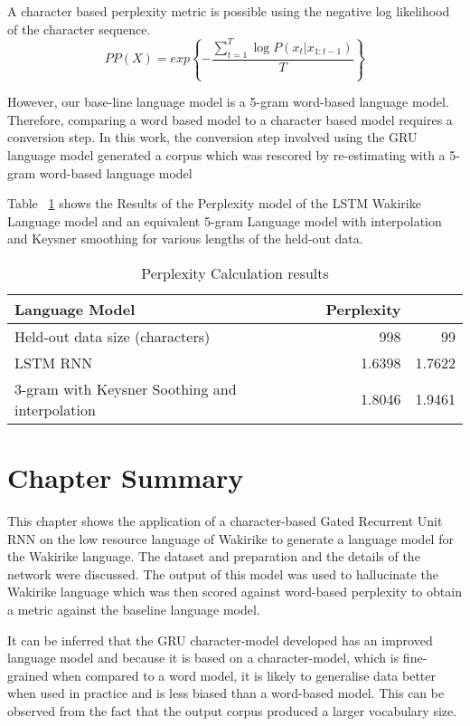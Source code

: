 A character based perplexity metric is possible using  the negative log likelihood of the character sequence.
\begin{equation}
    PP(X)=exp\left\{−\frac{\sum_{t=1}^T\log P(x_t|x_{1:t−1})}{T}\right\}
\label{ch5_eq3_ppx}
\end{equation}

However, our base-line language model is a 5-gram word-based language model.  Therefore, comparing a word based model to a character based model requires a conversion step. In this work, the conversion step involved using the GRU language model generated a corpus which was rescored by re-estimating with a 5-gram word-based language model

Table ~\ref{tab:example} shows the Results of the Perplexity model of the LSTM Wakirike Language model and an equivalent 5-gram Language model with interpolation and Keysner smoothing \citep{Heafield-estimate} for various lengths of the held-out data.


\begin{table}
  \caption{Perplexity Calculation results}
  \label{tab:example}
\begin{tabular}{lrr}
\toprule
Language Model & Perplexity  \\
\midrule
Held-out data size (characters) & 998 & 99\\
\midrule
LSTM RNN & 1.6398 & 1.7622\\
3-gram with Keysner Soothing and interpolation & 1.8046 & 1.9461\\
\bottomrule
\end{tabular}
\end{table}
\section{Chapter Summary}
This chapter shows the application of a character-based Gated Recurrent Unit RNN on the low resource language of Wakirike to generate a language model for the Wakirike language.  The dataset and preparation and the details of the network were discussed.  The output of this model was used to hallucinate the Wakirike language which was then scored against word-based perplexity to obtain a metric against the baseline language model.

It can be inferred that the GRU character-model developed has an improved language model and because it is based on a character-model, which is fine-grained when compared to a word model, it is likely to generalise data better when used in practice and is less biased than a word-based model.  This can be observed from the fact that the output corpus produced a larger vocabulary size.
